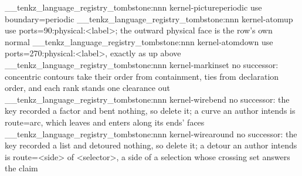 %
%
%
\__tenkz_language_registry_tombstone:nnn {kernel-picture}{periodic}
  {use boundary=periodic}
%
\__tenkz_language_registry_tombstone:nnn {kernel-atom}{up}
  {use ports={90:physical:<label>}; the outward physical face is the row's
    own normal}
\__tenkz_language_registry_tombstone:nnn {kernel-atom}{down}
  {use ports={270:physical:<label>}, exactly as up above}
%
\__tenkz_language_registry_tombstone:nnn {kernel-mark}{inset}
  {no successor: concentric contours take their order from containment,
    ties from declaration order, and each rank stands one clearance out}
\__tenkz_language_registry_tombstone:nnn {kernel-wire}{bend}
  {no successor: the key recorded a factor and bent nothing, so delete
    it; a curve an author intends is route=arc, which leaves and enters
    along its ends' faces}
\__tenkz_language_registry_tombstone:nnn {kernel-wire}{around}
  {no successor: the key recorded a list and detoured nothing, so delete
    it; a detour an author intends is route={<side> of <selector>}, a
    side of a selection whose crossing set answers the claim}

